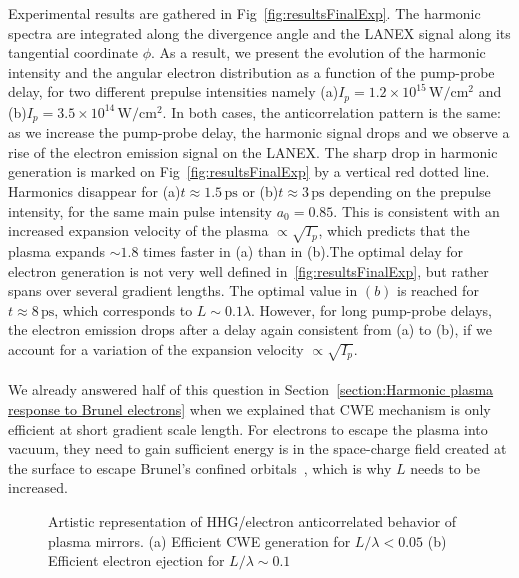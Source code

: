 \noindent Experimental results are gathered in Fig~\ref{fig:resultsFinalExp}. The harmonic spectra are integrated along the divergence angle and the LANEX signal along its tangential coordinate $\phi$. As a result, we present the evolution of the harmonic intensity and the angular electron distribution as a function of the pump-probe delay, for two different prepulse intensities namely (a)$I_p = 1.2 \times 10^{15}\,\mathrm{W/cm^2}$ and (b)$I_p = 3.5\times 10^{14}\,\mathrm{W/cm^2}$. In both cases, the anticorrelation pattern is the same: as we increase the pump-probe delay, the harmonic signal drops and we observe a rise of the electron emission signal on the LANEX. The sharp drop in harmonic generation is marked on Fig~\ref{fig:resultsFinalExp} by a vertical red dotted line. Harmonics disappear for (a)$t \approx 1.5\,\mathrm{ps}$ or (b)$t \approx 3\,\mathrm{ps}$ depending on the prepulse intensity, for the same main pulse intensity $a_0 = 0.85$. This is consistent with an increased expansion velocity of the plasma $\propto \sqrt{I_p}$, which predicts that the plasma expands $\sim 1.8$ times faster in (a) than in (b).The optimal delay for electron generation is not very well defined in~\ref{fig:resultsFinalExp}, but rather spans over several gradient lengths. The optimal value in $(b)$ is reached for $t\approx 8\,\mathrm{ps}$, which corresponds to $L\sim 0.1\lambda$. However, for long pump-probe delays, the electron emission drops after a delay again consistent from (a) to (b), if we account for a variation of the expansion velocity $\propto \sqrt{I_p}$.\\%

\\

\noindent We already answered half of this question in Section~\ref{section:Harmonic plasma response to Brunel electrons} when we explained that CWE mechanism is only efficient at short gradient scale length. For electrons to escape the plasma into vacuum, they need to gain sufficient energy is in the space-charge field created at the surface to escape Brunel's confined orbitals~\cite{Geindre2010,bocoum2016anticorrelated}, which is why $L$ needs to be increased. 

\begin{figure}[H]
\begin{center}
\end{center}
\caption{\label{fig:figure1}Artistic representation of HHG/electron anticorrelated behavior of plasma mirrors. (a) Efficient CWE generation for $L/\lambda < 0.05$ (b) Efficient electron ejection for $L/\lambda\sim 0.1$}
\end{figure}

